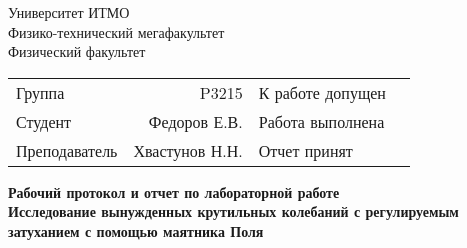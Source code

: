 \begin{titlepage}
	\thispagestyle{firststyle}
	\begin{center}
		Университет ИТМО \\
		Физико-технический мегафакультет \\
		Физический факультет \\
	\end{center}
	\vspace{1cm}
	\begin{center}
		\begin{tabular}{ l r l c }
			Группа        & P3215          & К работе допущен & \hspace{2cm} \\\cline{4-4}
			Студент       & Федоров Е.В.   & Работа выполнена & \hspace{2cm} \\\cline{4-4}
			Преподаватель & Хвастунов Н.Н. & Отчет принят     & \hspace{2cm} \\\cline{4-4}
		\end{tabular}
	\end{center}

	\vspace{2cm}

	\begin{center}
		\Large
		\textbf{Рабочий протокол и отчет по
			лабораторной работе 
		}
		\\
		\huge
		\textbf{Исследование вынужденных
			крутильных колебаний с регулируемым
			затуханием с помощью маятника Поля}
	\end{center}
\end{titlepage}
